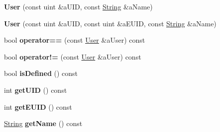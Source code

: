 \begin{DoxyCompactItemize}
\item 
\mbox{\label{classlibrary_1_1core_1_1system_1_1_user_af7960468619027fc5a9a19590583c969}} 
{\bfseries User} (const uint \&a\+U\+ID, const \hyperlink{classlibrary_1_1core_1_1types_1_1_string}{String} \&a\+Name)
\item 
\mbox{\label{classlibrary_1_1core_1_1system_1_1_user_a399449d4a49ca4ce9c060e17b0783fc8}} 
{\bfseries User} (const uint \&a\+U\+ID, const uint \&a\+E\+U\+ID, const \hyperlink{classlibrary_1_1core_1_1types_1_1_string}{String} \&a\+Name)
\item 
\mbox{\label{classlibrary_1_1core_1_1system_1_1_user_afffda972cba7158de4f92c150c8256ef}} 
bool {\bfseries operator==} (const \hyperlink{classlibrary_1_1core_1_1system_1_1_user}{User} \&a\+User) const
\item 
\mbox{\label{classlibrary_1_1core_1_1system_1_1_user_a666489af790bb3d4773bf2fe8cdaf947}} 
bool {\bfseries operator!=} (const \hyperlink{classlibrary_1_1core_1_1system_1_1_user}{User} \&a\+User) const
\item 
\mbox{\label{classlibrary_1_1core_1_1system_1_1_user_aba5006465e6c63c1a8693ad559ca53f1}} 
bool {\bfseries is\+Defined} () const
\item 
\mbox{\label{classlibrary_1_1core_1_1system_1_1_user_aafe10eadfc78497c3583badac20982e7}} 
int {\bfseries get\+U\+ID} () const
\item 
\mbox{\label{classlibrary_1_1core_1_1system_1_1_user_a57d138f9dc1cd5994ef06f54974f16bc}} 
int {\bfseries get\+E\+U\+ID} () const
\item 
\mbox{\label{classlibrary_1_1core_1_1system_1_1_user_a56ec63ee3e0f1d5bdfd9ab1814350c70}} 
\hyperlink{classlibrary_1_1core_1_1types_1_1_string}{String} {\bfseries get\+Name} () const
\end{DoxyCompactItemize}
